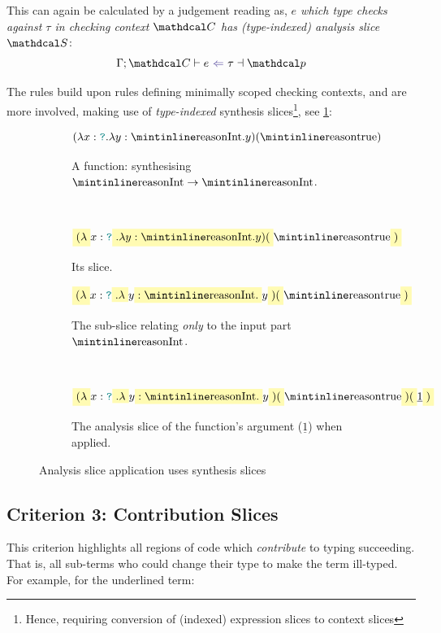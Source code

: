 This can again be calculated by a judgement reading as, \textit{$e$ which type checks against $\tau$ in checking context $\C$ has (type-indexed) analysis slice $\S$}:
\[\analysisslice{\C}{e}{\tau}{\p}\]

The rules build upon rules defining minimally scoped checking contexts, and are more involved, making use of \textit{type-indexed} synthesis slices\footnote{Hence, requiring conversion of (indexed) expression slices to context slices}, see \cref{fig:AnalysisSliceApplication}:
\begin{figure}[h]
\centering
\begin{subfigure}{\0.4\textwidth}
\[(\lambda x : \dyn. \lambda y : \code{Int}. y)(\code{true})\]
\caption{A function: synthesising $\code{Int} \to \code{Int}$.}
\end{subfigure}$\qquad$
\begin{subfigure}{\0.4\textwidth}
\[\hlcmaths[yellow!30]{(\lambda} x : \dyn\hlcmaths[yellow!30]{. \lambda y : \code{Int}. y)(}\code{true}\hlcmaths[yellow!30]{)}\]
\caption{Its slice.}
\end{subfigure}
\begin{subfigure}{\0.4\textwidth}
\[\hlcmaths[yellow!30]{(\lambda} x : \dyn\hlcmaths[yellow!30]{. \lambda} y \hlcmaths[yellow!30]{: \code{Int}.} y\hlcmaths[yellow!30]{)(}\code{true}\hlcmaths[yellow!30]{)}\]
\caption{The sub-slice relating \textit{only} to the input part $\code{Int}$.}
\end{subfigure}$\qquad$
\begin{subfigure}{\0.4\textwidth}
\[\hlcmaths[yellow!30]{(\lambda} x : \dyn\hlcmaths[yellow!30]{. \lambda} y \hlcmaths[yellow!30]{: \code{Int}.} y\hlcmaths[yellow!30]{)(}\code{true}\hlcmaths[yellow!30]{)(}\underline{1}\hlcmaths[yellow!30]{)}\]
\caption{The analysis slice of the function's argument ($\underline{1}$) when applied.}
\end{subfigure}
\caption{Analysis slice application uses synthesis slices}
\label{fig:AnalysisSliceApplication}
\end{figure}

\subsection{Criterion 3: Contribution Slices}
\label{sec:ContributionSlices}
This criterion highlights all regions of code which \textit{contribute} to typing succeeding. That is, all sub-terms who could change their type to make the term ill-typed. For example, for the underlined term:

